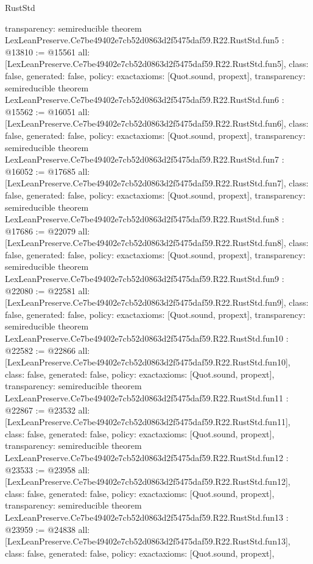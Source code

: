\begin{lexlean}{RustStd}
\begin{coremodule}
{  transparency: semireducible
}
theorem LexLeanPreserve.Ce7be49402e7cb52d0863d2f5475daf59.R22.RustStd.fun5 : @13810 := @15561 {
  all: [LexLeanPreserve.Ce7be49402e7cb52d0863d2f5475daf59.R22.RustStd.fun5],
  class: false,
  generated: false,
  policy: exact{axioms: [Quot.sound, propext]},
  transparency: semireducible
}
theorem LexLeanPreserve.Ce7be49402e7cb52d0863d2f5475daf59.R22.RustStd.fun6 : @15562 := @16051 {
  all: [LexLeanPreserve.Ce7be49402e7cb52d0863d2f5475daf59.R22.RustStd.fun6],
  class: false,
  generated: false,
  policy: exact{axioms: [Quot.sound, propext]},
  transparency: semireducible
}
theorem LexLeanPreserve.Ce7be49402e7cb52d0863d2f5475daf59.R22.RustStd.fun7 : @16052 := @17685 {
  all: [LexLeanPreserve.Ce7be49402e7cb52d0863d2f5475daf59.R22.RustStd.fun7],
  class: false,
  generated: false,
  policy: exact{axioms: [Quot.sound, propext]},
  transparency: semireducible
}
theorem LexLeanPreserve.Ce7be49402e7cb52d0863d2f5475daf59.R22.RustStd.fun8 : @17686 := @22079 {
  all: [LexLeanPreserve.Ce7be49402e7cb52d0863d2f5475daf59.R22.RustStd.fun8],
  class: false,
  generated: false,
  policy: exact{axioms: [Quot.sound, propext]},
  transparency: semireducible
}
theorem LexLeanPreserve.Ce7be49402e7cb52d0863d2f5475daf59.R22.RustStd.fun9 : @22080 := @22581 {
  all: [LexLeanPreserve.Ce7be49402e7cb52d0863d2f5475daf59.R22.RustStd.fun9],
  class: false,
  generated: false,
  policy: exact{axioms: [Quot.sound, propext]},
  transparency: semireducible
}
theorem LexLeanPreserve.Ce7be49402e7cb52d0863d2f5475daf59.R22.RustStd.fun10 : @22582 := @22866 {
  all: [LexLeanPreserve.Ce7be49402e7cb52d0863d2f5475daf59.R22.RustStd.fun10],
  class: false,
  generated: false,
  policy: exact{axioms: [Quot.sound, propext]},
  transparency: semireducible
}
theorem LexLeanPreserve.Ce7be49402e7cb52d0863d2f5475daf59.R22.RustStd.fun11 : @22867 := @23532 {
  all: [LexLeanPreserve.Ce7be49402e7cb52d0863d2f5475daf59.R22.RustStd.fun11],
  class: false,
  generated: false,
  policy: exact{axioms: [Quot.sound, propext]},
  transparency: semireducible
}
theorem LexLeanPreserve.Ce7be49402e7cb52d0863d2f5475daf59.R22.RustStd.fun12 : @23533 := @23958 {
  all: [LexLeanPreserve.Ce7be49402e7cb52d0863d2f5475daf59.R22.RustStd.fun12],
  class: false,
  generated: false,
  policy: exact{axioms: [Quot.sound, propext]},
  transparency: semireducible
}
theorem LexLeanPreserve.Ce7be49402e7cb52d0863d2f5475daf59.R22.RustStd.fun13 : @23959 := @24838 {
  all: [LexLeanPreserve.Ce7be49402e7cb52d0863d2f5475daf59.R22.RustStd.fun13],
  class: false,
  generated: false,
  policy: exact{axioms: [Quot.sound, propext]},
}
\end{coremodule}
\end{lexlean}
